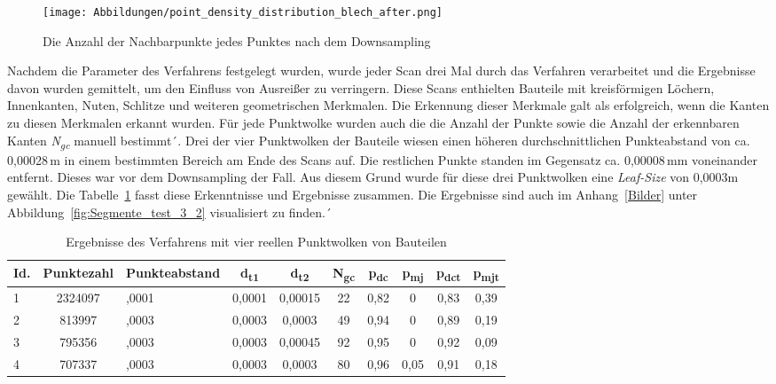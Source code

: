 \begin{figure}[t]
	\texttt{[image: Abbildungen/point\_density\_distribution\_blech\_after.png]}
	\centering
	\caption[Verteilung der Punktedichte nach dem Downsampling]{Die Anzahl der Nachbarpunkte jedes Punktes nach dem Downsampling}
	\label{fig: point_density_after}
\end{figure}

Nachdem die Parameter des Verfahrens festgelegt wurden, wurde jeder Scan drei Mal durch das Verfahren verarbeitet und die Ergebnisse davon wurden gemittelt, um den Einfluss von Ausreißer zu verringern. Diese Scans enthielten Bauteile mit kreisförmigen Löchern, Innenkanten, Nuten, Schlitze und weiteren geometrischen Merkmalen. Die Erkennung dieser Merkmale galt als erfolgreich, wenn die Kanten zu diesen Merkmalen erkannt wurden. Für jede Punktwolke wurden auch die die Anzahl der Punkte sowie die Anzahl der erkennbaren Kanten \textit{N\textsubscript{gc}} manuell bestimmt´. Drei der vier Punktwolken der Bauteile wiesen einen höheren durchschnittlichen Punkteabstand von ca. 0,00028\,\si{\m} in einem bestimmten Bereich am Ende des Scans auf. Die restlichen Punkte standen im Gegensatz ca. 0,00008\,\si{\m}m voneinander entfernt. Dieses war vor dem Downsampling der Fall. Aus diesem Grund wurde für diese drei Punktwolken eine \textit{Leaf-Size} von 0,0003m gewählt. Die Tabelle~\ref{table: test_3-2_results} fasst diese Erkenntnisse und Ergebnisse zusammen. Die Ergebnisse sind auch im Anhang~\ref{Bilder} unter Abbildung~\ref{fig:Segmente_test_3_2} visualisiert zu finden.´

\begin{table}[t]
	\centering
	\begin{tabularx}{\textwidth}{l c >{\centering}X *{7}{c}}
		\hline
		\textbf{Id.} & \textbf{Punktezahl} & \textbf{Punkteabstand} & \textbf{d\textsubscript{t1}} & \textbf{d\textsubscript{t2}} & \textbf{N\textsubscript{gc}} & \textbf{p\textsubscript{dc}} & \textbf{p\textsubscript{mj}} & \textbf{p\textsubscript{dct}} & \textbf{p\textsubscript{mjt}}\\
		\hline
		1 & 2324097 & 0,0001 & 0,0001 & 0,00015 & 22 & 0,82 & 0 & 0,83 & 0,39 \\
		2 & 813997 & 0,0003 & 0,0003 & 0,0003 & 49 & 0,94 & 0 & 0,89 & 0,19 \\
		3 & 795356 & 0,0003 & 0,0003 & 0,00045 & 92 & 0,95 & 0 & 0,92 & 0,09 \\
		4 & 707337 & 0,0003 & 0,0003 & 0,0003 & 80 & 0,96 & 0,05 & 0,91 & 0,18 \\
		\hline
	\end{tabularx}
	\caption[Ergebnisse der dritten Untersuchung]{Ergebnisse des Verfahrens mit vier reellen Punktwolken von Bauteilen}
	\label{table: test_3-2_results}
\end{table}

